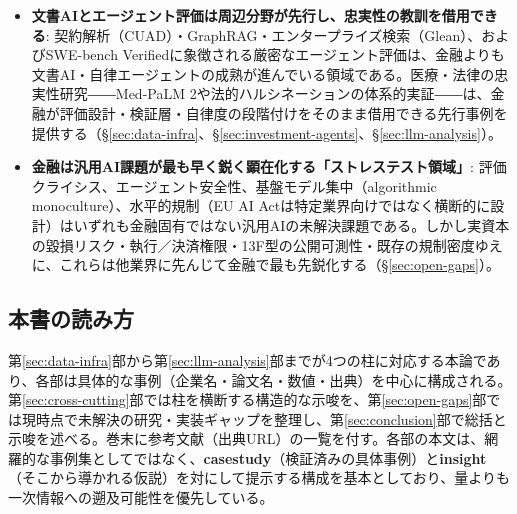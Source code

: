 \begin{itemize}
  \item \textbf{文書AIとエージェント評価は周辺分野が先行し、忠実性の教訓を借用できる}: 契約解析（CUAD\cite{y02cuad2021}）・GraphRAG\cite{y02graphrag2024}・エンタープライズ検索（Glean\cite{y02glean2025}）、およびSWE-bench Verified\cite{y04swebenchverified2024}に象徴される厳密なエージェント評価は、金融よりも文書AI・自律エージェントの成熟が進んでいる領域である。医療・法律の忠実性研究――Med-PaLM 2\cite{y05medpalm2_2025}や法的ハルシネーションの体系的実証\cite{y05dahl2024legalfictions}――は、金融が評価設計・検証層・自律度の段階付けをそのまま借用できる先行事例を提供する（\S\ref{sec:data-infra}、\S\ref{sec:investment-agents}、\S\ref{sec:llm-analysis}）。
  \item \textbf{金融は汎用AI課題が最も早く鋭く顕在化する「ストレステスト領域」}: 評価クライシス、エージェント安全性、基盤モデル集中（algorithmic monoculture\cite{y07monoculture2022}）、水平的規制（EU AI Actは特定業界向けではなく横断的に設計\cite{y07euaiacthorizontal}）はいずれも金融固有ではない汎用AIの未解決課題である。しかし実資本の毀損リスク・執行／決済権限・13F型の公開可測性・既存の規制密度ゆえに、これらは他業界に先んじて金融で最も先鋭化する（\S\ref{sec:open-gaps}）。
\end{itemize}

\subsection*{本書の読み方}

第\ref{sec:data-infra}部から第\ref{sec:llm-analysis}部までが4つの柱に対応する本論であり、各部は具体的な事例（企業名・論文名・数値・出典）を中心に構成される。第\ref{sec:cross-cutting}部では柱を横断する構造的な示唆を、第\ref{sec:open-gaps}部では現時点で未解決の研究・実装ギャップを整理し、第\ref{sec:conclusion}部で総括と示唆を述べる。巻末に参考文献（出典URL）の一覧を付す。各部の本文は、網羅的な事例集としてではなく、\textbf{casestudy}（検証済みの具体事例）と\textbf{insight}（そこから導かれる仮説）を対にして提示する構成を基本としており、量よりも一次情報への遡及可能性を優先している。
